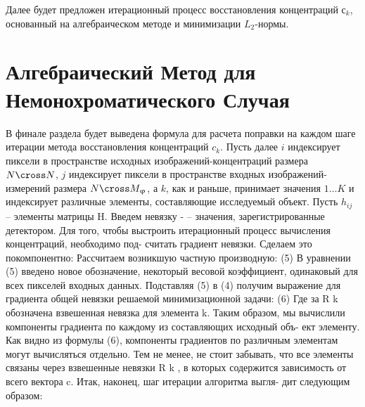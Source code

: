 Далее будет предложен итерационный процесс восстановления концентраций $с_k$, основанный на алгебраическом методе и минимизации $L_2$-нормы.

\section{Алгебраический Метод для Немонохроматического Случая}

В финале раздела будет выведена формула для расчета поправки на каждом шаге итерации метода восстановления концентраций $c_k$.
Пусть далее $i$ индексирует пиксели в пространстве исходных изображений-концентраций размера $N \cross N$, $j$ индексирует пиксели в пространстве входных изображений-измерений размера $N \cross M_\varphi$, а $k$, как и раньше, принимает значения $1 \dots K$ и индексирует различные элементы, составляющие исследуемый объект.
Пусть $h_{ij}$ – элементы матрицы H. 
Введем невязку -
– значения, зарегистрированные детектором. Для того, чтобы
выстроить итерационный процесс вычисления концентраций, необходимо под-
считать градиент невязки. Сделаем это покомпонентно:
Рассчитаем возникшую частную производную:
(5)
В уравнении (5) введено новое обозначение, некоторый весовой коэффициент,
одинаковый для всех пикселей входных данных. Подставляя (5) в (4) получим
выражение для градиента общей невязки решаемой минимизационной задачи:
(6)
Где за R k обозначена взвешенная невязка для элемента k. Таким образом, мы
вычислили компоненты градиента по каждому из составляющих исходный объ-
ект элементу. Как видно из формулы (6), компоненты градиентов по различным
элементам могут вычисляться отдельно. Тем не менее, не стоит забывать, что
все элементы связаны через взвешенные невязки R k , в которых содержится
зависимость от всего вектора c. Итак, наконец, шаг итерации алгоритма выгля-
дит следующим образом:
